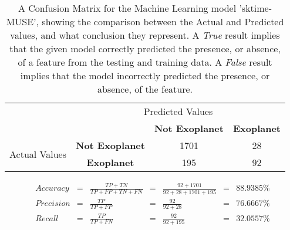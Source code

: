 
    \renewcommand{\arraystretch}{2}
    \renewcommand{\tabcolsep}{20.25pt}
    \begin{table}[ht]
    \begin{tabular}{cccc}
     & \multicolumn{3}{c}{Predicted Values} \\ \cline{3-4}
     & \multicolumn{1}{c|}{} & \multicolumn{1}{c|}{\textbf{Not Exoplanet}} & \multicolumn{1}{c|}{\textbf{Exoplanet}} \\ \cline{2-4}
    \multicolumn{1}{c|}{\multirow{2}{2.0cm}{Actual Values}} & \multicolumn{1}{c|}{\textbf{Not Exoplanet}} & \multicolumn{1}{c|}{1701} & \multicolumn{1}{c|}{28} \\ \cline{2-4}
    \multicolumn{1}{c|}{} & \multicolumn{1}{c|}{\textbf{Exoplanet}} & \multicolumn{1}{c|}{195} & \multicolumn{1}{c|}{92} \\ \cline{2-4}
    \end{tabular}
    \caption{A Confusion Matrix for the Machine Learning model 'sktime-MUSE', showing the comparison between the Actual and Predicted values, and what conclusion they represent. A \emph{True} result implies that the given model correctly predicted the presence, or absence, of a feature from the testing and training data. A \emph{False} result implies that the model incorrectly predicted the presence, or absence, of the feature.}
    \label{tab:sktime-MUSEconfusionmatrix}
    \end{table}

    \label{eq:precisionsktime-MUSE}
    \begin{align*}
        Accuracy &= &\frac{TP + TN}{TP + FP + TN + FN} &= &\frac{92 + 1701}{92 + 28 + 1701 + 195} &= & 88.9385\% \\
        Precision &= &\frac{TP}{TP + FP} &= &\frac{92}{92 + 28} &= & 76.6667\% \\
        Recall &= &\frac{TP}{TP + FN} &= &\frac{92}{92 + 195} &= & 32.0557\% \\
    \end{align*}

    \renewcommand{\arraystretch}{1}
    \renewcommand{\tabcolsep}{5.25pt}
    